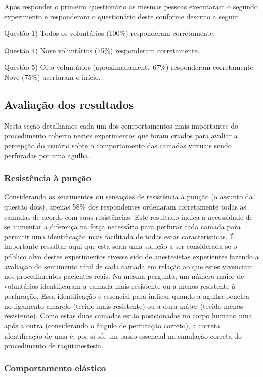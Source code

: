 Após responder o primeiro questionário as mesmas pessoas executaram o segundo experimento e responderam o questionário deste conforme descrito a seguir:

Questão 1) Todos os voluntários (100\%) responderam corretamente.

Questão 4) Nove voluntários (75\%) responderam corretamente.

Questão 5) Oito voluntários (aproximadamente 67\%) responderam corretamente. Nove (75\%) acertaram o início.

\subsection{Avaliação dos resultados}
\label{sec:avaliacao}

Nesta seção detalhamos cada um dos comportamentos mais importantes do procedimento coberto nestes experimentos que foram criados para avaliar a percepção do usuário sobre o comportamento das
camadas virtuais sendo perfuradas por uma agulha.

\subsubsection{Resistência à punção}

Considerando os sentimentos ou sensações de resistência à punção (o assunto da questão dois), apenas 58\% dos respondentes ordenaram corretamente todas as camadas de acordo com suas resistências. Este resultado indica a necessidade de se aumentar a diferença na força necessária para perfurar cada camada para permitir uma identificação mais facilitada de todas estas características. É importante ressaltar aqui que esta seria uma solução a ser considerada se o público alvo destes experimentos tivesse sido de anestesistas experientes fazendo a avaliação do sentimento tátil de cada camada em relação ao que estes vivenciam nos procedimentos pacientes reais. Na mesma pergunta, um número maior de voluntários identificaram a camada mais resistente ou a menos resistente à perfuração. Essa identificação é essencial para indicar quando a agulha penetra no ligamento amarelo (tecido mais resistente) ou a dura-máter (tecido menos resistente). Como estas duas camadas estão posicionadas no corpo humano uma após a outra (considerando o ângulo de perfuração correto), a correta identificação de uma é, por si só, um passo essencial na simulação correta do procedimento de raquianestesia.

\subsubsection{Comportamento elástico}

